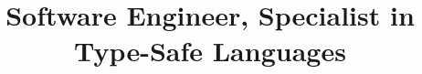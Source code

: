 \usepackage{fontspec}


\usepackage[scale=0.75]{geometry}
\setlength{\hintscolumnwidth}{20ex} %

\usepackage{xspace}

\usepackage{relsize}

\usepackage[super]{nth}

\usepackage{enumitem}


\newcommand\cpplang{C\nolinebreak[4]\hspace{-0.05em}\raisebox{0.3ex}{\relsize{-1}{\textbf{++}}}}



\title{Software Engineer, Specialist in Type-Safe Languages}
